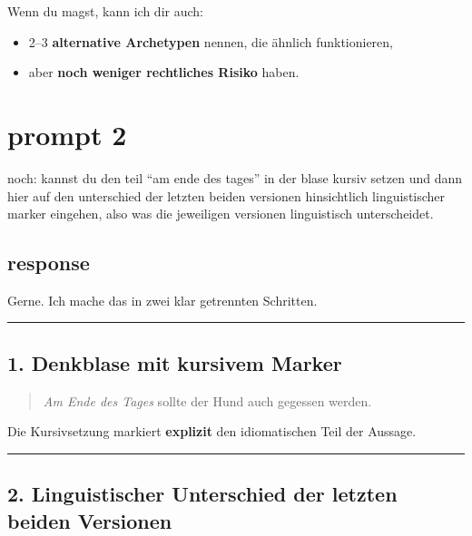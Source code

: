 \documentclass[
  letterpaper,
  DIV=11,
  numbers=noendperiod]{scrartcl}
\providecommand{\tightlist}{%
  \setlength{\itemsep}{0pt}\setlength{\parskip}{0pt}}
\begin{document}
Wenn du magst, kann ich dir auch:

\begin{itemize}
\tightlist
\item
  2--3 \textbf{alternative Archetypen} nennen, die ähnlich
  funktionieren,
\item
  aber \textbf{noch weniger rechtliches Risiko} haben.
\end{itemize}

\section{prompt 2}\label{prompt-2}

noch: kannst du den teil ``am ende des tages'' in der blase kursiv
setzen und dann hier auf den unterschied der letzten beiden versionen
hinsichtlich linguistischer marker eingehen, also was die jeweiligen
versionen linguistisch unterscheidet.

\subsection{response}\label{response-1}

Gerne. Ich mache das in zwei klar getrennten Schritten.

\begin{center}\rule{0.5\linewidth}{0.5pt}\end{center}

\subsection{1. Denkblase mit kursivem
Marker}\label{denkblase-mit-kursivem-marker}

\begin{quote}
\emph{Am Ende des Tages} sollte der Hund auch gegessen werden.
\end{quote}

Die Kursivsetzung markiert \textbf{explizit} den idiomatischen Teil der
Aussage.

\begin{center}\rule{0.5\linewidth}{0.5pt}\end{center}

\subsection{2. Linguistischer Unterschied der letzten beiden
Versionen}\label{linguistischer-unterschied-der-letzten-beiden-versionen}
\end{document}
